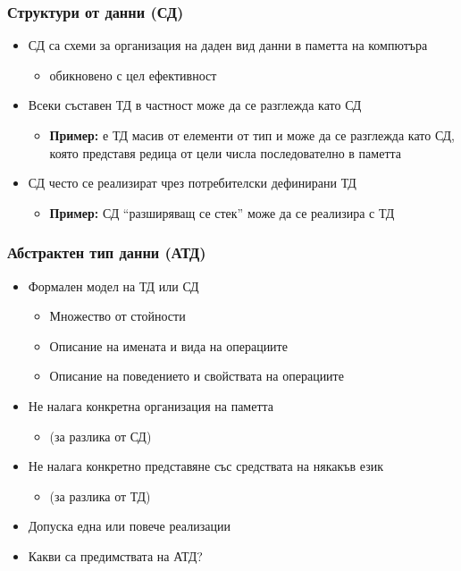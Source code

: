 \documentclass[alsotrans]{beamerswitch}
\begin{document}
\begin{frame}
  \frametitle{Структури от данни (СД)}

  \begin{itemize}[<+->]
  \item СД са схеми за организация на даден вид данни в паметта на компютъра
    \begin{itemize}
    \item обикновено с цел ефективност
    \end{itemize}
  \item Всеки съставен ТД в частност може да се разглежда като СД
    \begin{itemize}
    \item \textbf{Пример:}  е ТД масив от елементи от тип  и може да се разглежда като СД, която представя редица от цели числа последователно в паметта
    \end{itemize}
  \item СД често се реализират чрез потребителски дефинирани ТД
    \begin{itemize}
    \item \textbf{Пример:} СД ``разширяващ се стек'' може да се реализира с ТД 
    \end{itemize}
  \end{itemize}
\end{frame}

\begin{frame}
  \frametitle{Абстрактен тип данни (АТД)}

  \begin{itemize}[<+->]
  \item Формален модел на ТД или СД
    \begin{itemize}[<.->]
    \item Множество от стойности
    \item Описание на имената и вида на операциите
    \item Описание на поведението и свойствата на операциите
    \end{itemize}
  \item Не налага конкретна организация на паметта
    \begin{itemize}[<.->]
    \item (за разлика от СД)
    \end{itemize}
  \item Не налага конкретно представяне със средствата на някакъв език
    \begin{itemize}[<.->]
    \item (за разлика от ТД)
    \end{itemize}
  \item Допуска една или повече реализации
  \item \alert{Какви са предимствата на АТД?}
  \end{itemize}
\end{frame}
\end{document}
